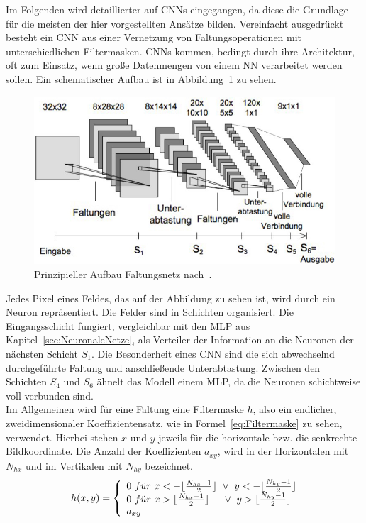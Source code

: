 \documentclass[times, 11pt,twocolumn]{article}
\begin{document}
 \label{sec:Faltungsnetze}
Im Folgenden wird detaillierter auf CNNs eingegangen, da diese die Grundlage für die meisten der hier vorgestellten Ansätze bilden. Vereinfacht ausgedrückt besteht ein CNN aus einer Vernetzung von Faltungsoperationen mit unterschiedlichen Filtermasken. CNNs kommen, bedingt durch ihre Architektur, oft zum Einsatz, wenn große Datenmengen von einem NN verarbeitet werden sollen. Ein schematischer Aufbau ist in Abbildung~\ref{fig:CNN} zu sehen. \\
\begin{figure}
	\flushleft
	\includegraphics[width=\columnwidth]{Bilder/structure-cnn.jpg}
	\caption{Prinzipieller Aufbau Faltungsnetz nach~\cite{Osadchy}.}
	\label{fig:CNN}
\end{figure}
Jedes Pixel eines Feldes, das auf der Abbildung zu sehen ist, wird durch ein Neuron repräsentiert. Die Felder sind in Schichten organisiert. Die Eingangsschicht fungiert, vergleichbar mit den MLP aus Kapitel~\ref{sec:NeuronaleNetze}, als Verteiler der Information an die Neuronen der nächsten Schicht $S_1$. Die Besonderheit eines CNN sind die sich abwechselnd durchgeführte Faltung und anschließende Unterabtastung. Zwischen den Schichten $S_4$ und $S_6$ ähnelt das Modell einem MLP, da die Neuronen schichtweise voll verbunden sind.\\
Im Allgemeinen wird für eine Faltung eine Filtermaske $h$, also ein endlicher, zweidimensionaler Koeffizientensatz, wie in Formel~\ref{eq:Filtermaske} zu sehen, verwendet. Hierbei stehen $x$ und $y$ jeweils für die horizontale bzw. die senkrechte Bildkoordinate. Die Anzahl der Koeffizienten $a_{xy}$, wird in der Horizontalen mit $N_{hx}$ und im Vertikalen mit $N_{hy}$ bezeichnet.
\footnotesize
\begin{equation} 
	h(x,y) = \left\lbrace
  \begin{array}{l@{}l}
   0~f\ddot{u}r~x<-\lfloor\frac{N_{hx}-1}{2}\rfloor~\vee~y<-\lfloor\frac{N_{hy}-1}{2}\rfloor\\
    0~f\ddot{u}r~x>\lfloor\frac{N_{hx}-1}{2}\rfloor~~~~\vee~y>\lfloor\frac{N_{hy}-1}{2}\rfloor \\
    a_{xy}
  \end{array}
  \right.	
	\label{eq:Filtermaske}
\end{equation}
\end{document}
